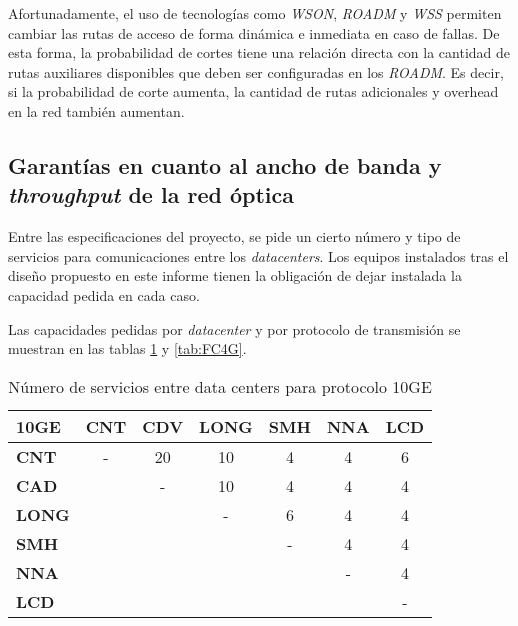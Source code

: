 Afortunadamente, el uso de tecnologías como \emph{WSON}, \emph{ROADM}
y \emph{WSS} permiten cambiar las rutas de acceso de forma dinámica e
inmediata en caso de fallas. De esta forma, la probabilidad de cortes
tiene una relación directa con la cantidad de rutas auxiliares disponibles
que deben ser configuradas en los \emph{ROADM}. Es decir, si la
probabilidad de corte aumenta, la cantidad de rutas adicionales y
overhead en la red también aumentan.

\subsection{Garantías en cuanto al ancho de banda y \emph{throughput}
  de la red óptica}
\label{sec:anchodebanda}

Entre las especificaciones del proyecto, se pide un cierto número y
tipo de servicios para comunicaciones entre los \emph{datacenters}. Los
equipos instalados tras el diseño propuesto en este informe tienen la
obligación de dejar instalada la capacidad pedida en cada caso.

Las capacidades pedidas por \emph{datacenter} y por protocolo de
transmisión se muestran en las tablas \ref{tab:10ge} y \ref{tab:FC4G}.

\begin{table}[H]
  \centering
  \begin{tabular}{| l | c | c | c | c | c | c |}
    \hline
    \textbf{10GE} & \textbf{CNT} & \textbf{CDV} & \textbf{LONG} & \textbf{SMH} & \textbf{NNA} & \textbf{LCD} \\
    \hline
    \textbf{CNT}  & - & 20 & 10 & 4 & 4 & 6 \\
    \hline
    \textbf{CAD}  &   & - & 10 & 4 & 4 & 4 \\
    \hline
    \textbf{LONG} &   &   & - & 6 & 4 & 4 \\
    \hline
    \textbf{SMH}  &   &   &   & - & 4 & 4 \\
    \hline
    \textbf{NNA}  &   &   &   &   & - & 4 \\
    \hline
    \textbf{LCD}  &   &   &   &   &   & - \\
    \hline
  \end{tabular}
  \caption{Número de servicios entre data centers para protocolo 10GE}
  \label{tab:10ge}
\end{table}

